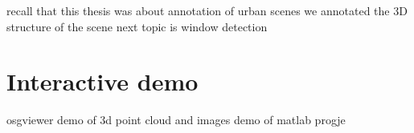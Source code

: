 recall that this thesis was about annotation of urban scenes
we annotated the 3D structure of the scene
next topic is window detection





\section{Interactive demo}
osgviewer demo of 3d point cloud and images
demo of matlab progje



